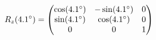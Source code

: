 \documentclass[preview]{standalone}
\begin{document}
\begin{align*}
\special{dvisvgm:raw <g id='unique000'>}R_z(4.1^\circ) = \begin{pmatrix} \cos(4.1^\circ) & -\sin(4.1^\circ) & 0 \\ \sin(4.1^\circ) & \cos(4.1^\circ) & 0 \\ 0 & 0 & 1 \end{pmatrix}\special{dvisvgm:raw </g>}
\end{align*}
\end{document}

